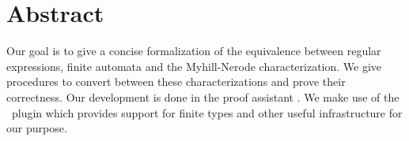 \chapter*{Abstract}
\label{chap:abstract}


Our goal is to give a concise formalization of the equivalence between regular expressions, finite automata and the Myhill-Nerode characterization. 
We give procedures to convert between these characterizations and prove their correctness.
Our development is done in the proof assistant \coq.
We make use of the \ssreflect\ plugin which provides support for finite types and other useful infrastructure for our purpose.
